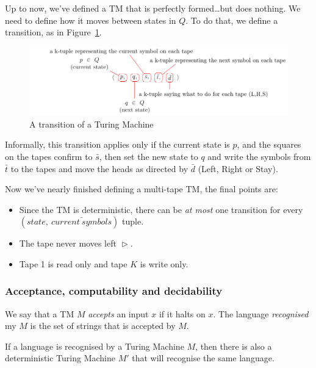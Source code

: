 Up to now, we've defined a TM that is perfectly formed\dots but does nothing. We
need to define how it moves between states in $Q$. To do that, we define a
transition, as in Figure~\ref{fig:tm-transition}.

\begin{figure}[H]
  \centering
  \includegraphics{equations/tm-transition}
  \caption{A transition of a Turing Machine}
  \label{fig:tm-transition}
\end{figure}

Informally, this transition applies only if the current state is $p$, and the
squares on the tapes confirm to $\bar{s}$, then set the new state to $q$ and
write the symbols from $\bar{t}$ to the tapes and move the heads as directed by
$\bar{d}$ (Left, Right or Stay).

Now we've nearly finished defining a multi-tape TM, the final points are:

\begin{itemize}
  \item Since the TM is deterministic, there can be \textit{at most} one 
    transition for every $(state,~\bar{current~symbols})$ tuple.
  \item The tape never moves left $\vartriangleright$.
  \item Tape 1 is read only and tape $K$ is write only.
\end{itemize}

\subsubsection{Acceptance, computability and decidability}

We say that a TM $M$ \textit{accepts} an input $x$ if it halts on $x$. The
language \textit{recognised} my $M$ is the set of strings that is accepted by
$M$.


If a language is recognised by a Turing Machine $M$, then there is also a 
deterministic Turing Machine $M'$ that will recognise the same language. 

